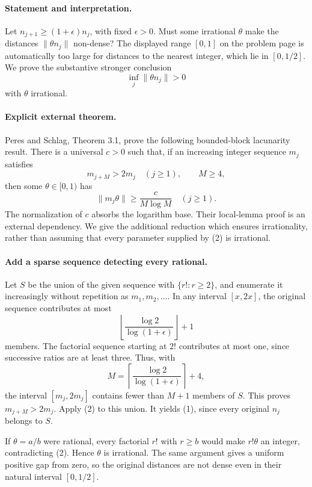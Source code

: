 \paragraph{Statement and interpretation.}
Let \(n_{j+1}\geq(1+\epsilon)n_j\), with fixed \(\epsilon>0\).
Must some irrational \(\theta\) make the distances
\(\|\theta n_j\|\) non-dense? The displayed range \([0,1]\) on the
problem page is automatically too large for distances to the nearest
integer, which lie in \([0,1/2]\). We prove the substantive stronger
conclusion
\[
 \inf_j\|\theta n_j\|>0
 \tag{1}
\]
with \(\theta\) irrational.

\paragraph{Explicit external theorem.}
Peres and Schlag, Theorem 3.1, prove the following bounded-block
lacunarity result. There is a universal \(c>0\) such that, if an
increasing integer sequence \(m_j\) satisfies
\[
 m_{j+M}>2m_j\quad(j\geq1),\qquad M\geq4,
\]
then some \(\theta\in[0,1)\) has
\[
 \|m_j\theta\|\geq \frac{c}{M\log M}\quad(j\geq1).
 \tag{2}
\]
The normalization of \(c\) absorbs the logarithm base.
Their local-lemma proof is an external dependency. We give the
additional reduction which ensures irrationality, rather than assuming
that every parameter supplied by (2) is irrational.

\paragraph{Add a sparse sequence detecting every rational.}
Let \(S\) be the union of the given sequence with
\(\{r!:r\geq2\}\), and enumerate it increasingly without repetition
as \(m_1,m_2,\ldots\).
In any interval \([x,2x]\), the original sequence contributes at most
\[
 \left\lfloor\frac{\log2}{\log(1+\epsilon)}\right\rfloor+1
\]
members. The factorial sequence starting at \(2!\) contributes at
most one, since successive ratios are at least three.
Thus, with
\[
 M=\left\lceil\frac{\log2}{\log(1+\epsilon)}\right\rceil+4,
\]
the interval \([m_j,2m_j]\) contains fewer than \(M+1\) members of
\(S\). This proves \(m_{j+M}>2m_j\).
Apply (2) to this union. It yields (1), since every original \(n_j\)
belongs to \(S\).

If \(\theta=a/b\) were rational, every factorial \(r!\) with \(r\geq b\)
would make \(r!\theta\) an integer, contradicting (2).
Hence \(\theta\) is irrational. The same argument gives a uniform
positive gap from zero, so the original distances are not dense even
in their natural interval \([0,1/2]\).

